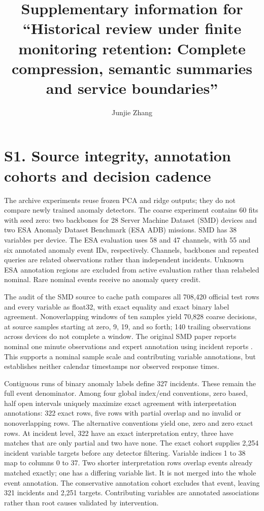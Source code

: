 \documentclass[11pt]{article}
\title{Supplementary information for ``Historical review under finite monitoring retention: Complete compression, semantic summaries and service boundaries''}
\author{Junjie Zhang}
\date{}
\begin{document}
\maketitle

\section*{S1. Source integrity, annotation cohorts and decision cadence}
The archive experiments reuse frozen PCA and ridge outputs; they do not compare newly trained anomaly detectors. The coarse experiment contains 60 fits with seed zero: two backbones for 28 Server Machine Dataset (SMD) devices and two ESA Anomaly Dataset Benchmark (ESA ADB) missions. SMD has 38 variables per device. The ESA evaluation uses 58 and 47 channels, with 55 and six annotated anomaly event IDs, respectively. Channels, backbones and repeated queries are related observations rather than independent incidents. Unknown ESA annotation regions are excluded from active evaluation rather than relabeled nominal. Rare nominal events receive no anomaly query credit.

The audit of the SMD source to cache path compares all 708,420 official test rows and every variable as float32, with exact equality and exact binary label agreement. Nonoverlapping windows of ten samples yield 70,828 coarse decisions, at source samples starting at zero, 9, 19, and so forth; 140 trailing observations across devices do not complete a window. The original SMD paper reports nominal one minute observations and expert annotation using incident reports \cite{Su2019Omni}. This supports a nominal sample scale and contributing variable annotations, but establishes neither calendar timestamps nor observed response times.

Contiguous runs of binary anomaly labels define 327 incidents. These remain the full event denominator. Among four global index/end conventions, zero based, half open intervals uniquely maximize exact agreement with interpretation annotations: 322 exact rows, five rows with partial overlap and no invalid or nonoverlapping rows. The alternative conventions yield one, zero and zero exact rows. At incident level, 322 have an exact interpretation entry, three have matches that are only partial and two have none. The exact cohort supplies 2,254 incident variable targets before any detector filtering. Variable indices 1 to 38 map to columns 0 to 37. Two shorter interpretation rows overlap events already matched exactly; one has a differing variable list. It is not merged into the whole event annotation. The conservative annotation cohort excludes that event, leaving 321 incidents and 2,251 targets. Contributing variables are annotated associations rather than root causes validated by intervention.
\end{document}
